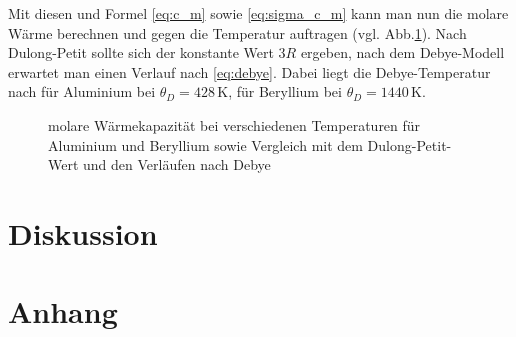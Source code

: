 \documentclass[12pt,a4paper,titlepage,headinclude,bibtotoc]{scrartcl}
\begin{document}
Mit diesen und Formel \eqref{eq:c_m} sowie \eqref{eq:sigma_c_m} kann man nun die molare Wärme berechnen und gegen die Temperatur auftragen (vgl. Abb.\ref{fig:molWaerme}).
Nach Dulong-Petit sollte sich der konstante Wert $3R$ ergeben, nach dem Debye-Modell erwartet man einen Verlauf nach \eqref{eq:debye}.
Dabei liegt die Debye-Temperatur nach \cite[S.226]{prakti} für Aluminium bei $\theta_D=428\,\si\kelvin$, für Beryllium bei $\theta_D=1440\,\si\kelvin$. 

\begin{figure}[!htb]
	\centering
	
	\caption{molare Wärmekapazität bei verschiedenen Temperaturen für Aluminium und Beryllium sowie Vergleich mit dem Dulong-Petit-Wert und den Verläufen nach Debye}
	\label{fig:molWaerme}
\end{figure}



\section{Diskussion}
\label{sec:diskussion}

\section{Anhang}



\end{document}
